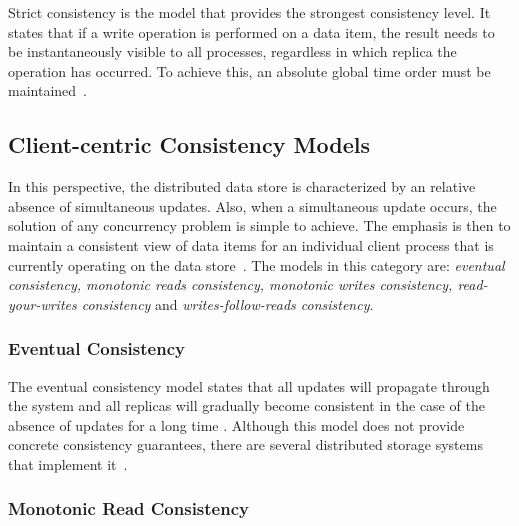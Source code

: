 Strict consistency is the model that provides the strongest consistency level. It states that if a write operation is performed on a data item, the result needs to be instantaneously visible to all processes, regardless in which replica the operation has occurred. To achieve this, an absolute global time order must be maintained~\cite{tanenbaum:2007}.
\\

\subsection{Client-centric Consistency Models}

In this perspective, the distributed data store is characterized by an relative absence of simultaneous updates.
Also, when a simultaneous update occurs, the solution of any concurrency problem is simple to achieve.
The emphasis is then to maintain a consistent view of data items for an individual client process that is currently operating on the data store~\cite{tanenbaum:2007}. 
The models in this category are: \textit{eventual consistency, monotonic reads consistency, monotonic writes consistency, read-your-writes consistency} and \textit{writes-follow-reads consistency}. %

\subsubsection{Eventual Consistency}

The eventual consistency model states that all updates will propagate through the system and all replicas will gradually become consistent in the case of the absence of updates for a long time \cite{tanenbaum:2007, Vogels:2009}. Although this model does not provide concrete consistency guarantees, there are several distributed storage systems that implement it~\cite{Chang06bigtable:a, decandia2007dynamo, Ghemawat2003Google, lakshman2010cassandra}.
\vspace{1mm}

\subsubsection{Monotonic Read Consistency}

